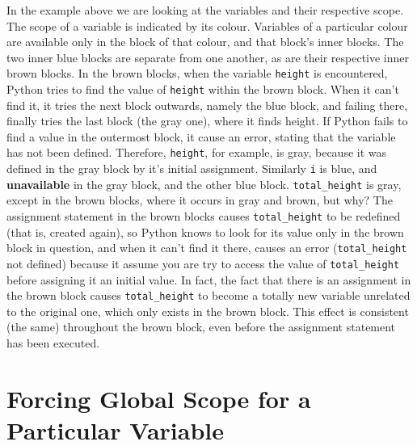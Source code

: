 In the example above we are looking at the variables and their   respective scope. The scope of a variable is indicated by its colour.   Variables of a particular colour are available only in the block of   that colour, and that block's inner blocks. The two inner blue blocks   are separate from one another, as are their respective inner brown   blocks. In the brown blocks, when the variable \texttt{height} is encountered,   Python tries to find the value of \texttt{height} within the brown block. When it   can't find it, it tries the next block outwards, namely the blue block,   and failing there, finally tries the last block (the gray one), where   it finds height. If Python fails to find a value in the outermost   block, it cause an error, stating that the variable has not been   defined.  Therefore, \texttt{height}, for example, is gray, because it was   defined in the gray block by it's initial assignment. Similarly \texttt{i}   is blue, and \textbf{unavailable} in the gray block, and the   other blue block. \texttt{total\_height} is gray, except in the brown blocks,   where it occurs in gray and brown, but why? The assignment statement   in the brown blocks causes \texttt{total\_height} to be redefined (that is, created again), so Python   knows to look for its value only in the brown block in question, and   when it can't find it there, causes an error (\texttt{total\_height} not   defined) because it assume you are try to access the value of \texttt{total\_height}   before assigning it an initial value. In fact, the fact that there is an   assignment in the brown block causes \texttt{total\_height} to become a totally   new variable unrelated to the original one, which only exists in the   brown block.  This effect is consistent (the same) throughout the brown block,   even before the assignment statement has been executed.

\section{Forcing Global Scope for a Particular Variable}

